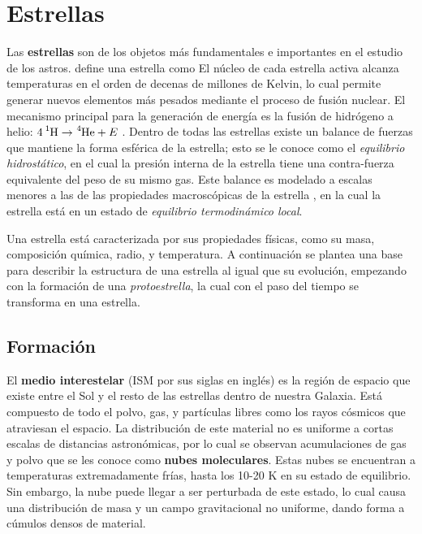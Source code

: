 \chapter{Estrellas}

Las \textbf{estrellas} son de los objetos más fundamentales e importantes en el
estudio de los astros.  define una
estrella como 
El núcleo de cada estrella activa alcanza temperaturas en el orden de decenas de
millones de Kelvin, lo cual permite generar nuevos elementos más pesados mediante el
proceso de fusión nuclear. El mecanismo principal para la generación de energía
es la fusión de hidrógeno a helio: $\ce{4 ^1H} \rightarrow \ce{^4He} + E$ .
Dentro de todas las estrellas existe un balance de fuerzas que mantiene la forma
esférica de la estrella; esto se le conoce como el \textit{equilibrio
hidrostático}, en el cual la presión interna de la estrella tiene una
contra-fuerza equivalente del peso de su mismo gas. Este balance es modelado a
escalas menores a las de las propiedades macroscópicas de la estrella
, en la cual la
estrella está en un estado de \textit{equilibrio termodinámico local}. 

Una estrella está caracterizada por sus propiedades físicas, como su masa,
composición química, radio, y temperatura. A continuación se plantea una base
para describir la estructura de una estrella al igual que su evolución,
empezando con la formación de una \textit{protoestrella}, la cual con el paso del
tiempo se transforma en una estrella.

\section{Formación}


El \textbf{medio interestelar} (ISM por sus siglas en inglés) es la región de
espacio que existe entre el Sol y el resto de las estrellas dentro de nuestra
Galaxia. Está compuesto de todo el polvo, gas, y partículas libres como los
rayos cósmicos que atraviesan el espacio. La distribución de este material no es
uniforme a cortas escalas de distancias astronómicas, por lo cual se observan
acumulaciones de gas y polvo que se les conoce como \textbf{nubes moleculares}.
Estas nubes se encuentran a temperaturas extremadamente frías, hasta los
10-20 K en su estado de equilibrio. Sin embargo, la nube puede llegar a ser
perturbada de este estado, lo cual causa una distribución de masa y un campo
gravitacional no uniforme, dando forma a cúmulos densos de material.

